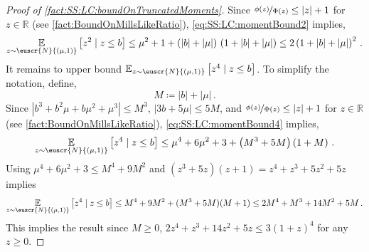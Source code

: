 \documentclass[11pt,letterpaper]{article}
\theoremstyle{plain}
\theoremstyle{definition}
\theoremstyle{remark}
\def\abs#1{\left| #1 \right|}
\newcommand{\inparen}[1]{\ensuremath{\left(#1\right)}}
\newcommand{\insquare}[1]{\ensuremath{\left[#1\right]}}
\newcommand{\R}{\mathbb{R}}
\newcommand{\E}{\operatornamewithlimits{\mathbb{E}}}
\newcommand{\Ex}{\E}
\newcommand{\nfrac}[2]{\nicefrac{#1}{#2}}
\newcommand{\customcal}[1]{\euscr{#1}}
\newcommand{\cN}{\customcal{N}}
\newcommand{\normal}[2]{\cN{\inparen{#1,#2}}}
\begin{document}
{{{\begin{proof}[Proof of \cref{fact:SS:LC:boundOnTruncatedMoments}]
             
            Since $\nfrac{\phi(z)}{\Phi(z)}\leq \abs{z}+1$ for $z\in \R$ (see \cref{fact:BoundOnMillsLikeRatio}),  \cref{eq:SS:LC:momentBound2} implies,
            \[
                \Ex_{z\sim \normal{\mu}{1}}\insquare{z^{{2}}\mid z\leq b} 
                \le \mu^2+1 + \inparen{\abs{b}+\abs{\mu}}\,\inparen{1+\abs{b}+\abs{\mu}}
                \leq 2\inparen{1+\abs{b}+\abs{\mu}}^2 
                \,.
            \] 
            It remains to upper bound $\Ex_{z\sim \normal{\mu}{1}}\insquare{z^{{4}}\mid z\leq b}$.
            To simplify the notation, define,
            \[
                M \coloneqq |b|+|\mu|\,.
            \]
            Since $\left|b^3+b^2\mu+b\mu^2+\mu^3\right|\le M^3$, $|3b+5\mu|\le 5M$, and $\nfrac{\phi(z)}{\Phi(z)}\leq \abs{z}+1$ for $z\in \R$ (see \cref{fact:BoundOnMillsLikeRatio}),  \cref{eq:SS:LC:momentBound4} implies,
            \[
                \Ex_{z\sim \normal{\mu}{1}}\insquare{z^{{4}}\mid z\leq b}
                \le 
                    \mu^4+6\mu^2+3 
                    +
                    \inparen{
                        M^3
                        +
                        5 M
                    } 
                    \inparen{1 + M}
                \,.
            \]
            Using $\mu^4+6\mu^2+3 \leq M^4 + 9 M^2$ and $(z^3+5z)(z+1) = z^4 + z^3 + 5z^2 + 5z$ implies 
            \[
                \Ex_{z\sim \normal{\mu}{1}}\insquare{z^{{4}}\mid z\leq b}
                \leq 
                M^4 + 9M^2 + (M^3+5M)(M+1)
                \leq 2M^4 + M^3 + 14M^2 + 5M\,.
            \]
            This implies the result since $M\geq 0$, $2z^4 + z^3 + 14z^2 + 5z\leq 3\inparen{1+z}^4$ for any $z\geq 0$.
        \end{proof}

}}}
\end{document}

